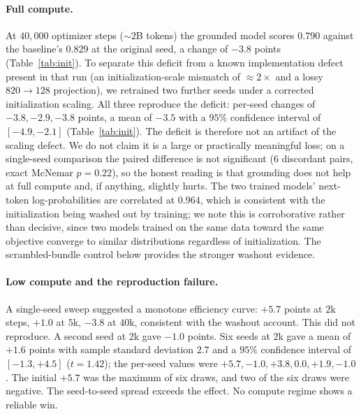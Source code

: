 \documentclass[twoside,11pt]{article}
\begin{document}
\paragraph{Full compute.}
At $40{,}000$ optimizer steps ($\sim$$2$B tokens) the grounded model scores $0.790$ against the baseline's $0.829$ at the original seed, a change of $-3.8$ points (Table~\ref{tab:init}). To separate this deficit from a known implementation defect present in that run (an initialization-scale mismatch of $\approx 2\times$ and a lossy $820 \to 128$ projection), we retrained two further seeds under a corrected initialization scaling. All three reproduce the deficit: per-seed changes of $-3.8, -2.9, -3.8$ points, a mean of $-3.5$ with a $95\%$ confidence interval of $[-4.9, -2.1]$ (Table~\ref{tab:init}). The deficit is therefore not an artifact of the scaling defect. We do not claim it is a large or practically meaningful loss; on a single-seed comparison the paired difference is not significant ($6$ discordant pairs, exact McNemar $p = 0.22$), so the honest reading is that grounding does not help at full compute and, if anything, slightly hurts. The two trained models' next-token log-probabilities are correlated at $0.964$, which is consistent with the initialization being washed out by training; we note this is corroborative rather than decisive, since two models trained on the same data toward the same objective converge to similar distributions regardless of initialization. The scrambled-bundle control below provides the stronger washout evidence.

\paragraph{Low compute and the reproduction failure.}
A single-seed sweep suggested a monotone efficiency curve: $+5.7$ points at $2$k steps, $+1.0$ at $5$k, $-3.8$ at $40$k, consistent with the washout account. This did not reproduce. A second seed at $2$k gave $-1.0$ points. Six seeds at $2$k gave a mean of $+1.6$ points with sample standard deviation $2.7$ and a $95\%$ confidence interval of $[-1.3, +4.5]$ ($t = 1.42$); the per-seed values were $+5.7, -1.0, +3.8, 0.0, +1.9, -1.0$. The initial $+5.7$ was the maximum of six draws, and two of the six draws were negative. The seed-to-seed spread exceeds the effect. No compute regime shows a reliable win.
\end{document}
